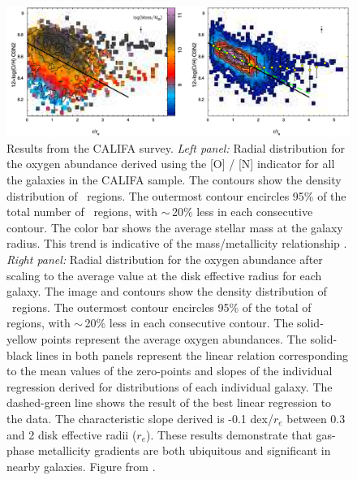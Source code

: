 \documentclass[11pt, a4paper, onecolumn]{article}
\begin{document}
\begin{multicols}{2}
\begin{figure}[!ht]
        \includegraphics[scale=0.45]{figures/sanchez12_fig9.pdf}

        \caption{\label{fig:sanchez} Results from the CALIFA survey.
            \textit{Left panel:} Radial distribution for the oxygen abundance
            derived using the [O\iii] / [N\ii] indicator for all the galaxies
            in the CALIFA sample.  The contours show the density distribution
            of \hii\ regions. The outermost contour encircles 95\% of the total
            number of \hii\ regions, with $\sim$\,20\% less in each consecutive
            contour. The color bar shows the average stellar mass at the galaxy
            radius. This trend is indicative of the mass/metallicity
            relationship \citep{tremonti04}. \textit{Right panel:} Radial
            distribution for the oxygen abundance after scaling to the average
            value at the disk effective radius for each galaxy. The image and
            contours show the density distribution of \hii\ regions. The
            outermost contour encircles 95\% of the total of \hii regions, with
            $\sim$\,20\% less in each consecutive contour.  The solid-yellow
            points represent the average oxygen abundances. The solid-black
            lines in both panels represent the linear relation corresponding to
            the mean values of the zero-points and slopes of the individual
            regression derived for distributions of each individual galaxy. The
            dashed-green line shows the result of the best linear regression to
            the data. The characteristic slope derived is -0.1 dex/$r_e$
            between 0.3 and 2 disk effective radii ($r_e$). These results
            demonstrate that gas-phase metallicity gradients are both
            ubiquitous and significant in nearby galaxies.  Figure from
        \citet{sanchez14}.\/}

    \end{figure}



\end{multicols}
\end{document}
